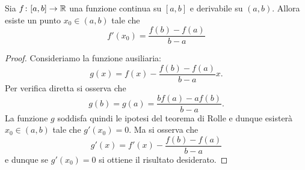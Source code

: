 \begin{theorem}[Lagrange]\label{th:lagrange}%
\mymark{***}%
%
%
%
Sia $f\colon [a,b]\to {\mathbb R}$ una funzione continua su $[a,b]$ e derivabile su $(a,b)$. Allora esiste un punto $x_0\in (a,b)$ tale che
\[
  f'(x_0) = \frac{f(b) - f(a)}{b-a}
\]
\end{theorem}
%
\begin{proof}
\mymark{***}
Consideriamo la funzione ausiliaria:
\[
  g(x) = f(x) - \frac{f(b)-f(a)}{b-a} x.
\]
Per verifica diretta si osserva che
\[
  g(b) = g(a) = \frac{b f(a) - a f(b)}{b-a}.
\]
La funzione $g$ soddisfa quindi le ipotesi del teorema di Rolle e dunque esisterà $x_0\in (a,b)$ tale che $g'(x_0)=0$.
Ma si osserva che
\[
  g'(x) = f'(x) - \frac{f(b)-f(a)}{b-a}
\]
e dunque se $g'(x_0)=0$ si ottiene il risultato desiderato.
\end{proof}

